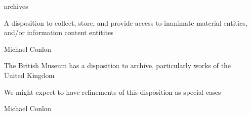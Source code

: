 \documentclass[letterpaper,10pt,english]{sphinxmanual}
\begin{document}
\begin{sphinxShadowBox}

\sphinxAtStartPar
archives
\end{sphinxShadowBox}

\begin{sphinxShadowBox}

\sphinxAtStartPar
{\hyperref[\detokenize{doc-BFO_0000016::doc}]{}}
\end{sphinxShadowBox}

\begin{sphinxShadowBox}

\sphinxAtStartPar
A disposition to collect, store, and provide access to inanimate material entities, and/or information content entitites
\end{sphinxShadowBox}

\begin{sphinxShadowBox}

\sphinxAtStartPar
Michael Conlon 
\end{sphinxShadowBox}

\begin{sphinxShadowBox}

\sphinxAtStartPar
The British Museum has a disposition to archive, particularly works of the United Kingdom
\end{sphinxShadowBox}

\begin{sphinxShadowBox}

\sphinxAtStartPar
We might expect to have refinements of this disposition as special cases
\end{sphinxShadowBox}

\begin{sphinxShadowBox}

\sphinxAtStartPar
Michael Conlon 
\end{sphinxShadowBox}
\begin{quote}

\ignorespaces \end{quote}
\end{document}
